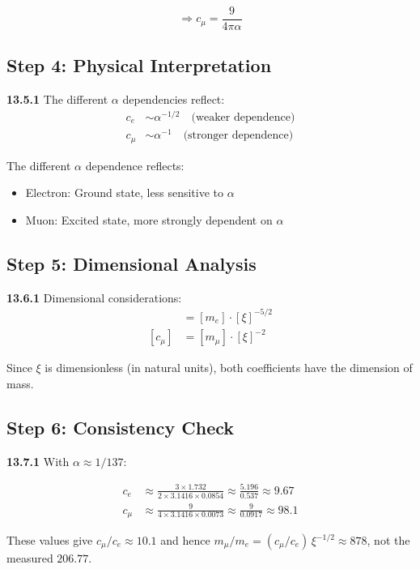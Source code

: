 \[
\Rightarrow c_\mu = \frac{9}{4\pi\alpha}
\]

\subsection{Step 4: Physical Interpretation}

\noindent \textbf{13.5.1} The different $\alpha$ dependencies reflect:
\begin{align*}
	c_e &\sim \alpha^{-1/2} \quad \text{(weaker dependence)} \\
	c_\mu &\sim \alpha^{-1} \quad \text{(stronger dependence)}
\end{align*}

The different $\alpha$ dependence reflects:
\begin{itemize}
	\item Electron: Ground state, less sensitive to $\alpha$
	\item Muon: Excited state, more strongly dependent on $\alpha$
\end{itemize}

\subsection{Step 5: Dimensional Analysis}

\noindent \textbf{13.6.1} Dimensional considerations:
\begin{align*}
	[c_e] &= [m_e] \cdot [\xi]^{-5/2} \\
	[c_\mu] &= [m_\mu] \cdot [\xi]^{-2}
\end{align*}

Since $\xi$ is dimensionless (in natural units), both coefficients have the dimension of mass.

\subsection{Step 6: Consistency Check}

\noindent \textbf{13.7.1} With $\alpha \approx 1/137$:

\begin{align*}
	c_e &\approx \frac{3 \times 1.732}{2 \times 3.1416 \times 0.0854} \approx \frac{5.196}{0.537} \approx 9.67 \\
	c_\mu &\approx \frac{9}{4 \times 3.1416 \times 0.0073} \approx \frac{9}{0.0917} \approx 98.1
\end{align*}

These values give $c_\mu/c_e \approx 10.1$ and hence $m_\mu/m_e = (c_\mu/c_e)\,\xi^{-1/2} \approx 878$, not the measured $206.77$.

